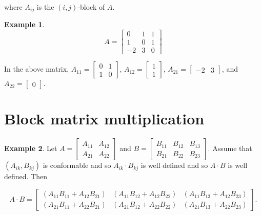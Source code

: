\documentclass[12pt]{article}
\theoremstyle{definition}
\newtheorem*{example}{Example}
\begin{document}
where $A_{ij}$ is the $(i, j)$-block of $A$.

\begin{example}
\[
A =
\left[
\begin{array}{cc|c}
0 & 1 & 1 \\
1 & 0 & 1 \\ \hline
-2 & 3 & 0
\end{array}
\right]
\]

In the above matrix, $A_{11} = \begin{bmatrix} 0 & 1 \\ 1 & 0 \end{bmatrix}$, $A_{12} = \begin{bmatrix}
1 \\ 1 \end{bmatrix}$, $A_{21} = \begin{bmatrix} -2 & 3 \end{bmatrix}$, and
$A_{22} = \begin{bmatrix} 0 \end{bmatrix}$.
\end{example}

\section{Block matrix multiplication}

\begin{example}
Let $A = \begin{bmatrix} A_{11} & A_{12} \\ A_{21} & A_{22} \end{bmatrix}$ and
$B = \begin{bmatrix} B_{11} & B_{12} & B_{13} \\ B_{21} & B_{22} & B_{23} \end{bmatrix}$. Assume that 
$(A_{ik} , B_{kj})$ is conformable and so $A_{ik} \cdot B_{kj}$ is well defined and so $A \cdot B$ is
well defined. Then

\[
A \cdot B =
\begin{bmatrix}
( A_{11} B_{11} + A_{12} B_{21} ) & ( A_{11} B_{12} + A_{12} B_{22} ) & ( A_{11} B_{13} + A_{12} B_{23} )\\
( A_{21} B_{11} + A_{22} B_{21} ) & ( A_{21} B_{12} + A_{22} B_{22} ) & ( A_{21} B_{13} + A_{22} B_{23}  )
\end{bmatrix}.
\]
\end{example}
\end{document}
